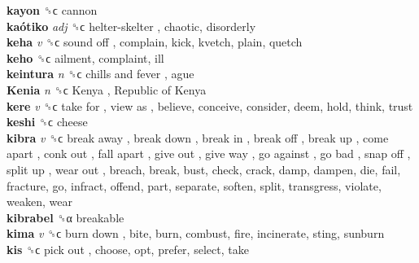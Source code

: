 \textbf{kayon} ␝ϲ  cannon  \\
\textbf{kaótiko} \emph{adj}  ␝ϲ   helter-skelter , chaotic, disorderly  \\
\textbf{keha} \emph{v}  ␝ϲ   sound off , complain, kick, kvetch, plain, quetch  \\
\textbf{keho} ␝ϲ  ailment, complaint, ill  \\
\textbf{keintura} \emph{n}  ␝ϲ   chills and fever , ague  \\
\textbf{Kenia} \emph{n}  ␝ϲ   Kenya ,  Republic of Kenya   \\
\textbf{kere} \emph{v}  ␝ϲ   take for ,  view as , believe, conceive, consider, deem, hold, think, trust  \\
\textbf{keshi} ␝ϲ  cheese  \\
\textbf{kibra} \emph{v}  ␝ϲ   break away ,  break down ,  break in ,  break off ,  break up ,  come apart ,  conk out ,  fall apart ,  give out ,  give way ,  go against ,  go bad ,  snap off ,  split up ,  wear out , breach, break, bust, check, crack, damp, dampen, die, fail, fracture, go, infract, offend, part, separate, soften, split, transgress, violate, weaken, wear  \\
\textbf{kibrabel} ␝α  breakable  \\
\textbf{kima} \emph{v}  ␝ϲ   burn down , bite, burn, combust, fire, incinerate, sting, sunburn  \\
\textbf{kis} ␝ϲ   pick out , choose, opt, prefer, select, take  \\
